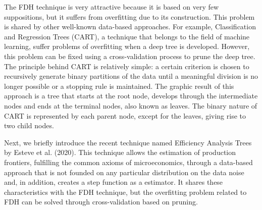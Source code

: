 The FDH technique is very attractive because it is based on very few suppositions, but it suffers from overfitting due to its construction. This problem is shared by other well-known data-based approaches. For example, Classification and Regression Trees (CART), a technique that belongs to the field of machine learning, suffer problems of overfitting when a deep tree is developed. However, this problem can be fixed using a cross-validation process to prune the deep tree. The principle behind CART is relatively simple: a certain criterion is chosen to recursively generate binary partitions of the data until a meaningful division is no longer possible or a stopping rule is maintained. The graphic result of this approach is a tree that starts at the root node, develops through the intermediate nodes and ends at the terminal nodes, also known as leaves. The binary nature of CART is represented by each parent node, except for the leaves, giving rise to two child nodes.

Next, we briefly introduce the recent technique named Efficiency Analysis Trees by Esteve et al. (2020). This technique allows the estimation of production frontiers, fulfilling the common axioms of microeconomics, through a data-based approach that is not founded on any particular distribution on the data noise and, in addition, creates a step function as a estimator. It shares these characteristics with the FDH technique, but the overfitting problem related to FDH can be solved through cross-validation based on pruning.

